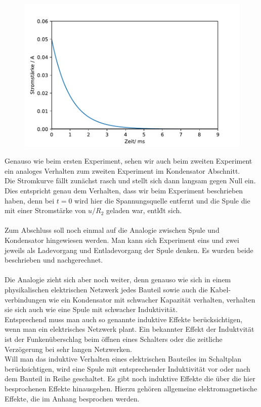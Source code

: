 \documentclass[11pt,a4paper,leqno]{report}
\numberwithin{equation}{chapter}
\begin{document}
  \begin{figure}[H]
	\begin{center}
		\includegraphics[scale=0.75]{Bilder/entladungsspule.pdf}
	\end{center}
\end{figure}
\noindent
Genauso wie beim ersten Experiment, sehen wir auch beim zweiten Experiment ein analoges Verhalten zum zweiten Experiment im Kondensator Abschnitt.\\
Die Stromkurve f\"allt zun\"achst rasch und stellt sich dann langsam gegen Null ein. Dies entspricht genau dem Verhalten, dass wir beim Experiment beschrieben haben, denn bei $t=0$ wird hier die Spannungsquelle entfernt und die Spule die mit einer Stromst\"arke von $u/R_2$ geladen war, entl\"dt sich.\\
\\
Zum Abschluss soll noch einmal auf die Analogie zwischen Spule und Kondensator hingewiesen werden. Man kann sich Experiment eins und zwei jeweils als Ladevorgang und Entladevorgang der Spule denken. Es wurden beide beschrieben und nachgerechnet.\\
\\
Die Analogie zieht sich aber noch weiter, denn genauso wie sich in einem physikalischen elektrischen Netzwerk jedes Bauteil sowie auch die Kabel- verbindungen wie ein Kondensator mit schwacher Kapazit\"at verhalten, verhalten sie sich auch wie eine Spule mit schwacher Induktivit\"at.\\
Entsprechend muss man auch so genannte induktive Effekte ber\"ucksichtigen, wenn man ein elektrisches Netzwerk plant. Ein bekannter Effekt der Induktvit\"at ist der Funken\"uberschlag beim \"offnen eines Schalters oder die zeitliche Verz\"ogerung bei sehr langen Netzwerken.\\
Will man das induktive Verhalten eines elektrischen Bauteiles im Schaltplan ber\"ucksichtigen, wird eine Spule mit entsprechender Induktivit\"at vor oder nach dem Bauteil in Reihe geschaltet. Es gibt noch induktive Effekte die \"uber die hier besprochenen Effekte hinausgehen. Hierzu geh\"oren allgemeine elektromagnetische Effekte, die im Anhang besprochen werden.
\end{document}
